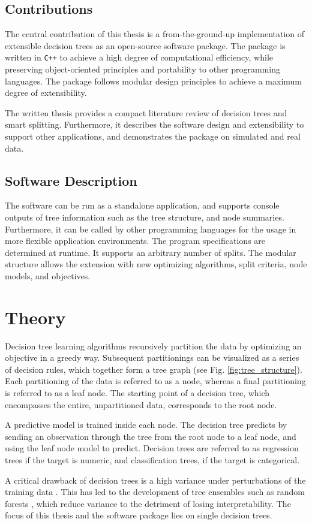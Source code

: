 \documentclass[a4paper, 11pt]{article}
\begin{document}
\subsection{Contributions} The central contribution of this thesis is a from-the-ground-up implementation of extensible decision trees as an open-source software package. The package is written in \texttt{C++} to achieve a high degree of computational efficiency, while preserving object-oriented principles and portability to other programming languages. The package follows modular design principles to achieve a maximum degree of extensibility.
\par
The written thesis provides a compact literature review of decision trees and smart splitting. Furthermore, it describes the software design and extensibility to support other applications, and demonstrates the package on simulated and real data.

\subsection{Software Description}

The software can be run as a standalone application, and supports console outputs of tree information such as the tree structure, and node summaries. Furthermore, it can be called by other programming languages for the usage in more flexible application environments. The program specifications are determined at runtime. It supports an arbitrary number of splits. 
The modular structure allows the extension with 
new optimizing algorithms, split criteria, node models, and objectives. 

\section{Theory}

Decision tree learning algorithms recursively partition the data by optimizing an objective in a greedy way. Subsequent partitionings can be visualized as a series of decision rules, which together form a tree graph (see Fig. \ref{fig:tree_structure}). Each partitioning of the data is referred to as a node, whereas a final partitioning is referred to as a leaf node. The starting point of a decision tree, which encompasses the entire, unpartitioned data, corresponds to the root node.
\par
A predictive model is trained inside each node.
The decision tree predicts by sending an observation through the tree from the root node to a leaf node, and using the leaf node model to predict.
Decision trees are referred to as regression trees if the target is numeric, and classification trees, if the target is categorical.
\par
A critical drawback of decision trees is a high variance under perturbations of the training data \cite{hastie_elemstatlearn}. This has led to the development of tree ensembles such as random forests \cite{breiman_randomforests}, which reduce variance to the detriment of losing interpretability. The focus of this thesis and the software package lies on single decision trees.
\end{document}
